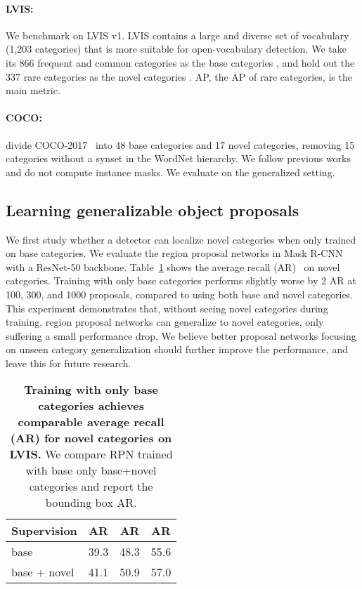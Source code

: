 \documentclass{article} \usepackage{iclr2022_conference,times}
\def\vs{{\bm{s}}}
\begin{document}
\paragraph{LVIS:} 
We benchmark on LVIS v1.
LVIS contains a large and diverse set of vocabulary (1,203 categories) that is more suitable for open-vocabulary detection.
We take its 866 frequent and common categories as the base categories , and hold out the 337 rare categories as the novel categories . AP, the AP of rare categories, is the main metric.


\paragraph{COCO:}
\citet{bansal2018zero} divide COCO-2017~\citep{coco} into 48 base categories and 17 novel categories, removing 15 categories without a synset in the WordNet hierarchy. 
We follow previous works and do not compute instance masks. We evaluate on the generalized setting.



\subsection{Learning generalizable object proposals}\label{sec:proposal}
We first study whether a detector can localize novel categories when only trained on base categories. 
We evaluate the region proposal networks in Mask R-CNN with a ResNet-50 backbone.
Table~\ref{table:proposal} shows the average recall (AR)~\citep{coco} on novel categories. Training with only base categories performs slightly worse by  2 AR at 100, 300, and 1000 proposals, compared to using both base and novel categories. This experiment demonstrates that, without seeing novel categories during training, region proposal networks can generalize to novel categories, only suffering a small performance drop. We believe better proposal networks focusing on unseen category generalization should further improve the performance, and leave this for future research.

\begin{table}[h]
\vspace{-1ex}
\caption{\textbf{Training with only base categories achieves comparable average recall (AR) for novel categories on LVIS.} We compare RPN trained with base only \vs base+novel categories and report the bounding box AR.}
\label{table:proposal}
\vspace{-1ex}
\centering
{\footnotesize
\begin{tabular}{lccc}
\toprule
Supervision & AR & AR & AR \\
\midrule
base & 39.3 & 48.3 & 55.6 \\
base + novel & 41.1 & 50.9 & 57.0 \\
\bottomrule
\end{tabular}
}
\vspace{-2ex}
\end{table}
\end{document}
